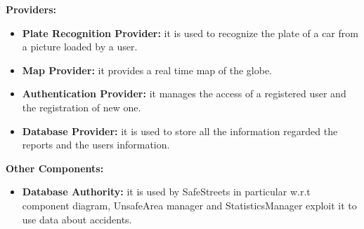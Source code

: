 \documentclass[../RASD.tex]{subfiles}
\begin{document}
    \textbf{Providers:}
    \\
    \begin{itemize}
        \item \textbf{Plate Recognition Provider:} it is used to recognize the plate of a car from a picture loaded by a user.
        \item \textbf{Map Provider:} it provides a real time map of the globe.
        \item \textbf{Authentication Provider:} it manages the access of a registered user and the registration of new one.
        \item \textbf{Database Provider:} it is used to store all the information regarded the reports and the users information.
    \end{itemize}
    \textbf{Other Components:}
    \\
    \begin{itemize}
        \item \textbf{Database Authority:} it is used by SafeStreets in particular w.r.t component diagram, UnsafeArea manager and StatisticsManager
        exploit it to use data about accidents.
    \end{itemize}
    \newpage
\end{document}
